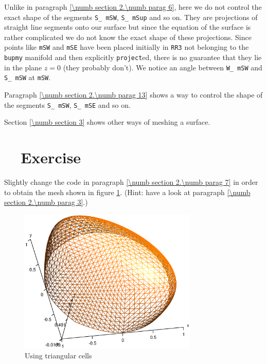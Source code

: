 Unlike in paragraph \ref{\numb section 2.\numb parag 6}, here we do not control the
exact shape of the segments {\small\tt S\_\,mSW}, {\small\tt S\_\,mSup} and so on.
They are projections of straight line segments onto our surface but since the equation
of the surface is rather complicated we do not know the exact shape of these projections.
Since points like {\small\tt mSW} and {\small\tt mSE} have been placed initially in
{\small\tt RR3} not belonging to the {\small\tt bupmy} manifold and then explicitly
{\small\tt project}ed,
there is no guarantee that they lie in the plane $ z = 0 $ (they probably don't).
We notice an angle between {\small\tt W\_\,mSW} and {\small\tt S\_\,mSW} at {\small\tt mSW}.

Paragraph \ref{\numb section 2.\numb parag 13} shows a way to control the shape of the segments
{\small\tt S\_\,mSW}, {\small\tt S\_\,mSE} and so on.

Section \ref{\numb section 3} shows other ways of meshing a surface.


\section{~~Exercise}\label{\numb section 2.\numb parag 8}

Slightly change the code in paragraph \ref{\numb section 2.\numb parag 7}
in order to obtain the mesh shown in figure \ref{\numb section 2.\numb fig 8}.
(Hint: have a look at paragraph \ref{\numb section 2.\numb parag 3}.)

\begin{figure}[ht] \centering
  \includegraphics[width=85mm]{hemisphere-1}
  \caption{Using triangular cells}
  \label{\numb section 2.\numb fig 8}
\end{figure}


